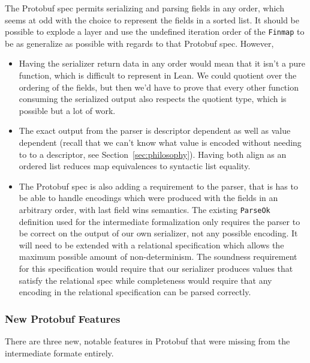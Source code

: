 The Protobuf spec permits serializing and parsing fields in any order, which
seems at odd with the choice to represent the fields in a sorted list. It should
be possible to explode a layer and use the undefined iteration order of the
\texttt{Finmap} to be as generalize as possible with regards to that Protobuf
spec. However,

\begin{itemize}
\item Having the serializer return data in any order would mean that it isn't a
  pure function, which is difficult to represent in Lean. We could quotient over
  the ordering of the fields, but then we'd have to prove that every other
  function consuming the serialized output also respects the quotient type,
  which is possible but a lot of work.
\item The exact output from the parser is descriptor dependent as well as value
  dependent (recall that we can't know what value is encoded without needing to
  to a descriptor, see Section~\ref{sec:philosophy}). Having both align as an
  ordered list reduces map equivalences to syntactic list equality.
\item The Protobuf spec is also adding a requirement to the parser, that is has
  to be able to handle encodings which were produced with the fields in an
  arbitrary order, with last field wins semantics. The existing \texttt{ParseOk}
  definition used for the intermediate formalization only requires the parser to
  be correct on the output of our own serializer, not any possible encoding. It
  will need to be extended with a relational specification which allows the
  maximum possible amount of non-determinism. The soundness requirement for this
  specification would require that our serializer produces values that satisfy
  the relational spec while completeness would require that any encoding in the
  relational specification can be parsed correctly.
\end{itemize}

\subsubsection{New Protobuf Features}

There are three new, notable features in Protobuf that were missing from the
intermediate formate entirely.

